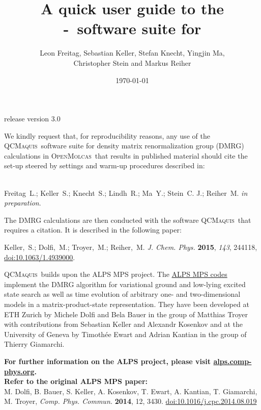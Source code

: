 \documentclass[bibliography=totoc,12pt,a4paper]{scrartcl}
\title{A quick user guide to the\\ \scine-\qcm\ software suite for \mol}
\author{Leon Freitag, Sebastian Keller, Stefan Knecht, Yingjin Ma,\\ Christopher Stein and Markus Reiher}
\date{\today}
\newcommand{\relv}{release version 3.0}
\newcommand{\mol}{\textsc{OpenMolcas}}
\newcommand{\qcm}{\textsc{QCMaquis}}
\begin{document}


\maketitle
\thispagestyle{empty}
\begin{center}
\end{center}
\vspace{-1.85cm}
\centerline{\large{\relv}}

\vspace{2cm}
\noindent We kindly request that, for reproducibility reasons, any use of the \qcm\ software suite for  density matrix renormalization group (DMRG) calculations in \mol\ that results in published material should cite the set-up steered by settings and warm-up procedures described in:
\begin{framed}
		\\
	\noindent Freitag~L.; Keller~S.; Knecht~S.; Lindh~R.; Ma~Y.; Stein~C. J.; Reiher~M. \emph{in preparation}.
\end{framed}

The DMRG calculations are then conducted with the software \qcm\ that requires a citation. It is described in the following paper:
\begin{framed}
\noindent Keller,~S.; Dolfi,~M.; Troyer,~M.; Reiher,~M. \emph{J. Chem. Phys.}
  \textbf{2015}, \emph{143}, 244118, \href{https://doi.org/10.1063/1.4939000}{doi:10.1063/1.4939000}.
\end{framed}

\qcm\ builds upon the ALPS MPS project. The \href{http://alps.comp-phys.org/static/mps\_doc/index.html}{ALPS MPS codes} implement the DMRG algorithm for variational ground and low-lying excited state search as well as time evolution of arbitrary one- and two-dimensional models in a matrix-product-state representation. They have been developed at ETH Zurich by Michele Dolfi and Bela Bauer in the group of Matthias Troyer with contributions from Sebastian Keller and Alexandr Kosenkov and at the University of Geneva by Timoth{\'e}e Ewart and Adrian Kantian in the group of Thierry Giamarchi.

\begin{framed}
\noindent \textbf{For further information on the ALPS project, please visit \href{alps.comp-phys.org}{alps.comp-phys.org}.}\\[2ex]
\textbf{Refer to the original ALPS MPS paper:}\\
M. Dolfi, B. Bauer, S. Keller, A. Kosenkov, T. Ewart, A. Kantian, T. Giamarchi, M. Troyer, \textit{Comp. Phys. Commun.} \textbf{2014}, 12, 3430. \href{https://doi.org/10.1016/j.cpc.2014.08.019}{doi:10.1016/j.cpc.2014.08.019}
\end{framed}
\end{document}
